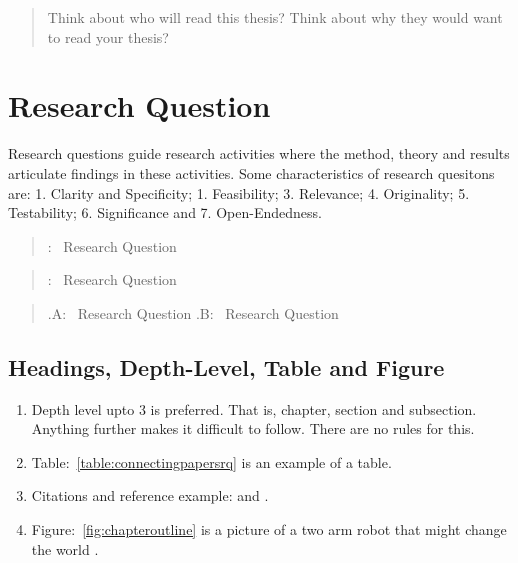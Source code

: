 \begin{quote}
Think about who will read this thesis? \newline
Think about why they would want to read your thesis?
\end{quote}



\section{Research Question}  

Research questions guide research activities where the method, theory and results articulate findings in these activities.
Some characteristics of research quesitons are: 
1. Clarity and Specificity; 
1. Feasibility;
3. Relevance;
4. Originality; 
5. Testability;
6. Significance and
7. Open-Endedness.

\begin{quote}
:~ Research Question 
\end{quote}

\begin{quote}
:~ Research Question 
\end{quote}

\begin{quote}
.A:~ Research Question \newline
{}.B:~ Research Question 
\end{quote}
 
 

   
\subsection{Headings, Depth-Level, Table and Figure}

\begin{enumerate}
\item Depth level upto 3 is preferred. That is, chapter, section and subsection. Anything further makes it difficult to follow. There are no rules for this.  

\item Table:~\ref{table:connectingpapersrq} is an example of a table. 

\item Citations and reference example: \cite{salvendy2012handbook} and \cite{salvendy1994design}.

\item Figure:~\ref{fig:chapteroutline} is a picture of a two arm robot that might change the world \cite{abb2017}.


\end{enumerate}	
 

